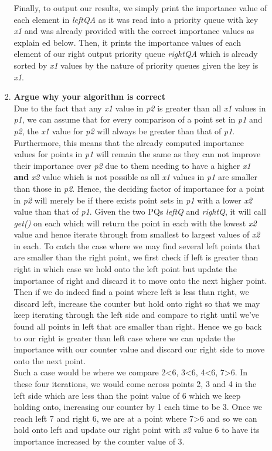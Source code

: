 \documentclass[11pt, oneside]{article}   	%
\begin{document}
\begin{enumerate}
\begin{enumerate}
\begin{enumerate}
			Finally, to output our results, we simply print the importance value of each element in \textit{leftQA} as it was read into a priority queue with key \textit{x1} and was already provided with the correct importance values as explain ed below. Then, it prints the importance values of each element of our right output priority queue \textit{rightQA} which is already sorted by \textit{x1} values by the nature of priority queues given the key is \textit{x1}.
			
			\item \textbf{Argue why your algorithm is correct}\\
			Due to the fact that any \textit{x1} value in \textit{p2} is greater than all \textit{x1} values in \textit{p1}, we can assume that for every comparison of a point set in \textit{p1} and \textit{p2}, the \textit{x1} value for \textit{p2} will always be greater than that of \textit{p1}. Furthermore, this means that the already computed importance values for points in \textit{p1} will remain the same as they can not improve their importance over \textit{p2} due to them needing to have a higher \textit{x1} \textbf{and} \textit{x2} value which is not possible as all \textit{x1} values in \textit{p1} are smaller than those in \textit{p2}. Hence, the deciding factor of importance for a point in \textit{p2} will merely be if there exists point sets in \textit{p1} with a lower \textit{x2} value than that of \textit{p1}. Given the two PQs \textit{leftQ} and \textit{rightQ}, it will call \textit{get()} on each which will return the point in each with the lowest \textit{x2} value and hence iterate through from smallest to largest values of \textit{x2} in each. To catch the case where we may find several left points that are smaller than the right point, we first check if left is greater than right in which case we hold onto the left point but update the importance of right and discard it to move onto the next higher point. Then if we do indeed find a point where left is less than right, we discard left, increase the counter but hold onto right so that we may keep iterating through the left side and compare to right until we've found all points in left that are smaller than right. Hence we go back to our right is greater than left case where we can update the importance with our counter value and discard our right side to move onto the next point.\\
			Such a case would be where we compare 2\textless6, 3\textless6, 4\textless6, 7\textgreater6. In these four iterations, we would come across points 2, 3 and 4 in the left side which are less than the point value of 6 which we keep holding onto, increasing our counter by 1 each time to be 3. Once we reach left 7 and right 6, we are at a point where 7\textgreater6 and so we can hold onto left and update our right point with \textit{x2} value 6 to have its importance increased by the counter value of 3.\\

\end{enumerate}
\end{enumerate}
\end{enumerate}
\end{document}
